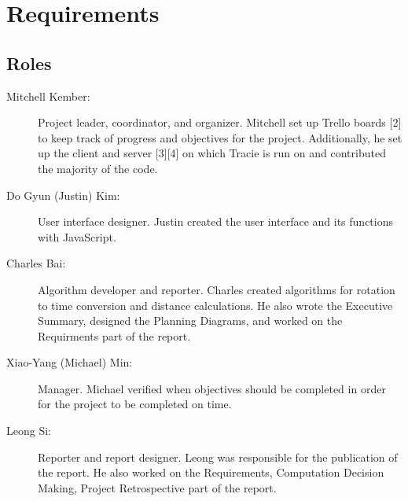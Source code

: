 \documentclass[11pt, letterpaper]{article}
\begin{document}
	\section{Requirements}

		\subsection{Roles}
		\begin{description}
			\item[Mitchell Kember:] 
				Project leader, coordinator, and organizer. Mitchell set up Trello boards [2] to keep track of progress and objectives for the project. Additionally, he set up the client and server [3][4] on which Tracie is run on and contributed the majority of the code.
			\item[Do Gyun (Justin) Kim:]
				User interface designer. Justin created the user interface and its functions with JavaScript.
			\item[Charles Bai:]
				Algorithm developer and reporter. Charles created algorithms for rotation to time conversion and distance calculations. He also wrote the Executive Summary, designed the Planning Diagrams, and worked on the Requirments part of the report.
			\item[Xiao-Yang (Michael) Min:]
				Manager. Michael verified when objectives should be completed in order for the project to be completed on time.
			\item[Leong Si:]
				Reporter and report designer. Leong was responsible for the publication of the report. He also worked on the Requirements, Computation Decision Making, Project Retrospective part of the report.
		\end{description}
\end{document}
